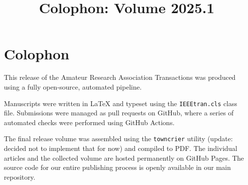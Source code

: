 \documentclass[conference, compsoc, draft]{IEEEtran}
\title{Colophon: Volume 2025.1}
\author{
    \IEEEauthorblockN{The ARA Founding Committee}
    \IEEEauthorblockA{
        contact@ara.pub \\
        https://ara.pub
    }
}
\begin{document}
\IEEEoverridecommandlockouts
{}

\maketitle

\IEEEpubidadjcol

\section*{Colophon}

This release of the Amateur Research Association Transactions was produced using a fully open-source, automated pipeline.

Manuscripts were written in LaTeX and typeset using the \texttt{IEEEtran.cls} class file. Submissions were managed as pull requests on GitHub, where a series of automated checks were performed using GitHub Actions.

The final release volume was assembled using the \texttt{towncrier} utility (update: decided not to implement that for now) and compiled to PDF. The individual articles and the collected volume are hosted permanently on GitHub Pages. The source code for our entire publishing process is openly available in our main repository.
\end{document}

